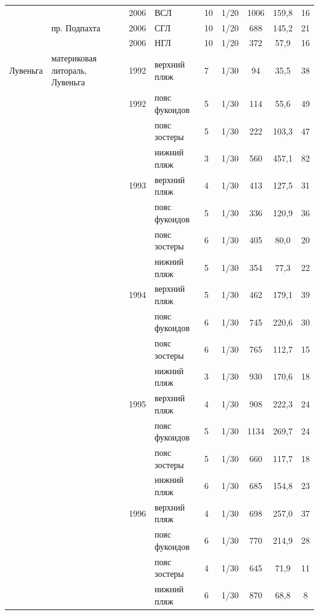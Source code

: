 \begin{footnotesize}
\begin{longtable}{|p{2cm}|p{3cm}|p{1cm}|p{2cm}|p{1.5cm}|p{1cm}|*{3}{c|}}
		 &  & 2006 & ВСЛ & 10 & 1/20 & 1006 & 159,8 & 16
		\\ \cline{2-9}
		 & пр. Подпахта & 2006 & СГЛ & 10 & 1/20 & 688 & 145,2 & 21
		\\ \cline{3-9}
		 &  & 2006 & НГЛ & 10 & 1/20 & 372 & 57,9 & 16
		\\ \hline
	Лувеньга & материковая литораль, Лувеньга & 1992 & верхний пляж & 7 & 1/30 & 94 & 35,5 & 38
		\\ \cline{4-9}
		 &  & 1992 & пояс фукоидов & 5 & 1/30 & 114 & 55,6 & 49
		\\ \cline{4-9}
		 &  &  & пояс зостеры & 5 & 1/30 & 222 & 103,3 & 47
		\\ \cline{4-9}
		 &  &  & нижний пляж & 3 & 1/30 & 560 & 457,1 & 82
		\\ \cline{3-9}
		 &  & 1993 & верхний пляж & 4 & 1/30 & 413 & 127,5 & 31
		\\ \cline{4-9}
		 &  &  & пояс фукоидов & 5 & 1/30 & 336 & 120,9 & 36
		\\ \cline{4-9}
		 &  &  & пояс зостеры & 6 & 1/30 & 405 & 80,0 & 20
		\\ \cline{4-9}
		 &  & & нижний пляж & 5 & 1/30 & 354 & 77,3 & 22
		\\ \cline{3-9}
		 &  & 1994 & верхний пляж & 5 & 1/30 & 462 & 179,1 & 39
		\\ \cline{4-9}
		 &  &  & пояс фукоидов & 6 & 1/30 & 745 & 220,6 & 30
		\\ \cline{4-9}
		 &  &  & пояс зостеры & 6 & 1/30 & 765 & 112,7 & 15
		\\ \cline{4-9}
		 &  &  & нижний пляж & 3 & 1/30 & 930 & 170,6 & 18
		\\ \cline{3-9}
		 &  & 1995 & верхний пляж & 4 & 1/30 & 908 & 222,3 & 24
		\\ \cline{4-9}
		 &  &  & пояс фукоидов & 5 & 1/30 & 1134 & 269,7 & 24
		\\ \cline{4-9}
		 &  &  & пояс зостеры & 5 & 1/30 & 660 & 117,7 & 18
		\\ \cline{4-9}
		 &  &  & нижний пляж & 6 & 1/30 & 685 & 154,8 & 23
		\\ \cline{3-9}
		 &  & 1996 & верхний пляж & 4 & 1/30 & 698 & 257,0 & 37
		\\ \cline{4-9}
		 &  &  & пояс фукоидов & 6 & 1/30 & 770 & 214,9 & 28
		\\ \cline{4-9}
		 &  &  & пояс зостеры & 4 & 1/30 & 645 & 71,9 & 11
		\\ \cline{4-9}
		 &  &  & нижний пляж & 6 & 1/30 & 870 & 68,8 & 8
		\\ \cline{3-9}

\end{longtable}
\end{footnotesize}
